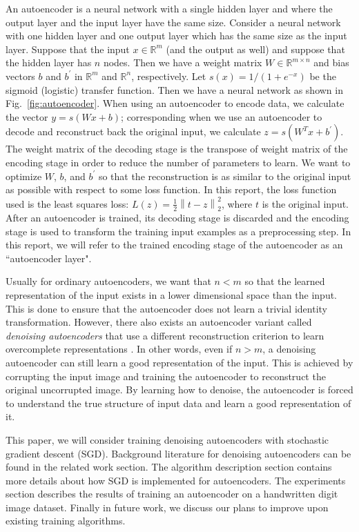 \documentclass[conference]{IEEEtran}
\newcommand{\norm}[1]{\left\lVert #1 \right\rVert}
\begin{document}
An autoencoder is a neural network with a single hidden layer and where the output layer and the input layer have the same size. Consider a neural network with one hidden layer and one output layer which has the same size as the input layer. Suppose that the input $x\in\mathbb{R}^m$ (and the output as well) and suppose that the hidden layer has $n$ nodes. Then we have a weight matrix $W\in\mathbb{R}^{m\times n}$ and bias vectors $b$ and $b^{'}$ in $\mathbb{R}^m$ and $\mathbb{R}^n$, respectively. Let $s(x) = 1/(1+e^{-x})$ be the sigmoid (logistic) transfer function. Then we have a neural network as shown in Fig.~\ref{fig:autoencoder}. When using an autoencoder to encode data, we calculate the vector $y=s(Wx + b)$; corresponding when we use an autoencoder to decode and reconstruct back the original input, we calculate $z=s(W^{T}x+b^{'})$. The weight matrix of the decoding stage is the transpose of weight matrix of the encoding stage in order to reduce the number of parameters to learn. We want to optimize $W$, $b$, and $b^{'}$ so that the reconstruction is as similar to the original input as possible with respect to some loss function. In this report, the loss function used is the least squares loss: $L(z)=\frac{1}{2}\norm{t-z}_2^2$, where $t$ is the original input. After an autoencoder is trained, its decoding stage is discarded and the encoding stage is used to transform the training input examples as a preprocessing step. In this report, we will refer to the trained encoding stage of the autoencoder as an ``autoencoder layer".  

Usually for ordinary autoencoders, we want that $n<m$ so that the learned representation of the input exists in a lower dimensional space than the input. This is done to ensure that the autoencoder does not learn a trivial identity transformation. However, there also exists an autoencoder variant called \textit{denoising autoencoders} that use a different reconstruction criterion to learn overcomplete representations \cite{vincent2010stacked}. In other words, even if $n>m$, a denoising autoencoder can still learn a good representation of the input. This is achieved by corrupting the input image and training the autoencoder to reconstruct the original uncorrupted image. By learning how to denoise, the autoencoder is forced to understand the true structure of input data and learn a good representation of it. 

This paper, we will consider training denoising autoencoders with stochastic gradient descent (SGD). Background literature for denoising autoencoders can be found in the related work section. The algorithm description section contains more details about how SGD is implemented for autoencoders. The experiments section describes the results of training an autoencoder on a handwritten digit image dataset. Finally in future work, we discuss our plans to improve upon existing training algorithms.
\end{document}
